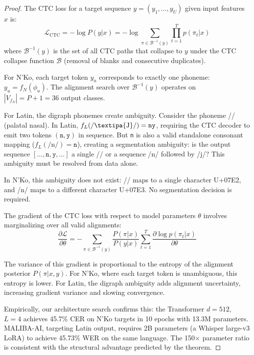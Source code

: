 \documentclass[11pt]{article}
\theoremstyle{remark}
\begin{document}
\begin{proof}
The CTC loss for a target sequence $y = (y_1, \ldots, y_U)$ given input features $x$ is:
\begin{equation}
\mathcal{L}_{\text{CTC}} = -\log P(y | x) = -\log \sum_{\pi \in \mathcal{B}^{-1}(y)} \prod_{t=1}^{T} p(\pi_t | x)
\end{equation}
where $\mathcal{B}^{-1}(y)$ is the set of all CTC paths that collapse to $y$ under the CTC collapse function $\mathcal{B}$ (removal of blanks and consecutive duplicates).

For N'Ko, each target token $y_u$ corresponds to exactly one phoneme: $y_u = f_N(\phi_u)$. The alignment search over $\mathcal{B}^{-1}(y)$ operates on $|V_{f_N}| = P + 1 = 36$ output classes.

For Latin, the digraph phonemes create ambiguity. Consider the phoneme // (palatal nasal). In Latin, $f_L(\text{/\textipa{J}/}) = \texttt{ny}$, requiring the CTC decoder to emit two tokens $(\texttt{n}, \texttt{y})$ in sequence. But \texttt{n} is also a valid standalone consonant mapping ($f_L(\text{/n/}) = \texttt{n}$), creating a segmentation ambiguity: is the output sequence $[\ldots, \texttt{n}, \texttt{y}, \ldots]$ a single // or a sequence /n/ followed by /j/? This ambiguity must be resolved from data alone.

In N'Ko, this ambiguity does not exist: // maps to a single character U+07E2, and /n/ maps to a different character U+07E3. No segmentation decision is required.

The gradient of the CTC loss with respect to model parameters $\theta$ involves marginalizing over all valid alignments:
\begin{equation}
\frac{\partial \mathcal{L}}{\partial \theta} = -\sum_{\pi \in \mathcal{B}^{-1}(y)} \frac{P(\pi | x)}{P(y | x)} \sum_{t=1}^{T} \frac{\partial \log p(\pi_t | x)}{\partial \theta}
\end{equation}

The variance of this gradient is proportional to the entropy of the alignment posterior $P(\pi | x, y)$. For N'Ko, where each target token is unambiguous, this entropy is lower. For Latin, the digraph ambiguity adds alignment uncertainty, increasing gradient variance and slowing convergence.

Empirically, our architecture search confirms this: the Transformer $d=512$, $L=4$ achieves 45.7\% CER on N'Ko targets in 10 epochs with 13.3M parameters. MALIBA-AI, targeting Latin output, requires 2B parameters (a Whisper large-v3 LoRA) to achieve 45.73\% WER on the same language. The 150$\times$ parameter ratio is consistent with the structural advantage predicted by the theorem.
\end{proof}
\end{document}
